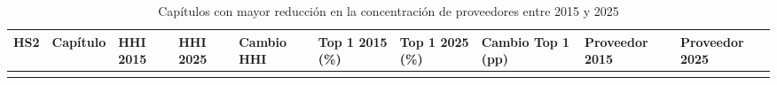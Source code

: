 \documentclass[
]{article}
\begin{document}
\begin{longtable}[]{@{}
  >{\raggedright\arraybackslash}p{}
  >{\raggedright\arraybackslash}p{}
  >{\raggedleft\arraybackslash}p{}
  >{\raggedleft\arraybackslash}p{}
  >{\raggedleft\arraybackslash}p{}
  >{\raggedleft\arraybackslash}p{}
  >{\raggedleft\arraybackslash}p{}
  >{\raggedleft\arraybackslash}p{}
  >{\raggedright\arraybackslash}p{}
  >{\raggedright\arraybackslash}p{}@{}}
\caption{Capítulos con mayor reducción en la concentración de
proveedores entre 2015 y 2025}\tabularnewline
\toprule\noalign{}
\begin{minipage}[b]{\linewidth}\raggedright
HS2
\end{minipage} & \begin{minipage}[b]{\linewidth}\raggedright
Capítulo
\end{minipage} & \begin{minipage}[b]{\linewidth}\raggedleft
HHI 2015
\end{minipage} & \begin{minipage}[b]{\linewidth}\raggedleft
HHI 2025
\end{minipage} & \begin{minipage}[b]{\linewidth}\raggedleft
Cambio HHI
\end{minipage} & \begin{minipage}[b]{\linewidth}\raggedleft
Top 1 2015 (\%)
\end{minipage} & \begin{minipage}[b]{\linewidth}\raggedleft
Top 1 2025 (\%)
\end{minipage} & \begin{minipage}[b]{\linewidth}\raggedleft
Cambio Top 1 (pp)
\end{minipage} & \begin{minipage}[b]{\linewidth}\raggedright
Proveedor 2015
\end{minipage} & \begin{minipage}[b]{\linewidth}\raggedright
Proveedor 2025
\end{minipage} \\
\midrule\noalign{}
\endfirsthead
\toprule\noalign{}
\begin{minipage}[b]{\linewidth}\raggedright

\end{minipage}
\end{longtable}
\end{document}

